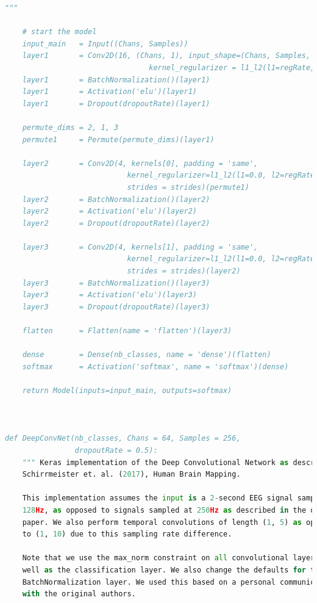 \documentclass[conference]{IEEEtran}
\begin{document}
\begin{lstlisting}[language=Python, caption=Machine Learning Model, label=ml_model]
    """

    # start the model
    input_main   = Input((Chans, Samples))
    layer1       = Conv2D(16, (Chans, 1), input_shape=(Chans, Samples, 1),
                                 kernel_regularizer = l1_l2(l1=regRate, l2=regRate))(input_main)
    layer1       = BatchNormalization()(layer1)
    layer1       = Activation('elu')(layer1)
    layer1       = Dropout(dropoutRate)(layer1)
    
    permute_dims = 2, 1, 3
    permute1     = Permute(permute_dims)(layer1)
    
    layer2       = Conv2D(4, kernels[0], padding = 'same', 
                            kernel_regularizer=l1_l2(l1=0.0, l2=regRate),
                            strides = strides)(permute1)
    layer2       = BatchNormalization()(layer2)
    layer2       = Activation('elu')(layer2)
    layer2       = Dropout(dropoutRate)(layer2)
    
    layer3       = Conv2D(4, kernels[1], padding = 'same',
                            kernel_regularizer=l1_l2(l1=0.0, l2=regRate),
                            strides = strides)(layer2)
    layer3       = BatchNormalization()(layer3)
    layer3       = Activation('elu')(layer3)
    layer3       = Dropout(dropoutRate)(layer3)
    
    flatten      = Flatten(name = 'flatten')(layer3)
    
    dense        = Dense(nb_classes, name = 'dense')(flatten)
    softmax      = Activation('softmax', name = 'softmax')(dense)
    
    return Model(inputs=input_main, outputs=softmax)



def DeepConvNet(nb_classes, Chans = 64, Samples = 256,
                dropoutRate = 0.5):
    """ Keras implementation of the Deep Convolutional Network as described in
    Schirrmeister et. al. (2017), Human Brain Mapping.
    
    This implementation assumes the input is a 2-second EEG signal sampled at 
    128Hz, as opposed to signals sampled at 250Hz as described in the original
    paper. We also perform temporal convolutions of length (1, 5) as opposed
    to (1, 10) due to this sampling rate difference. 
    
    Note that we use the max_norm constraint on all convolutional layers, as 
    well as the classification layer. We also change the defaults for the
    BatchNormalization layer. We used this based on a personal communication 
    with the original authors.
    

\end{lstlisting}
\end{document}
